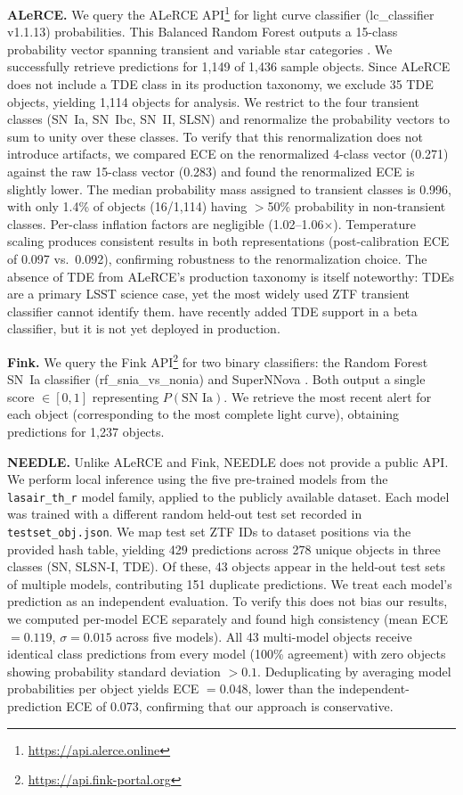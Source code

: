 \documentclass[twocolumn]{aastex631}
\begin{document}
\textbf{ALeRCE.} We query the ALeRCE API\footnote{\url{https://api.alerce.online}} for light curve classifier (lc\_classifier v1.1.13) probabilities. This Balanced Random Forest outputs a 15-class probability vector spanning transient and variable star categories \citep{sanchezsaez2021}. We successfully retrieve predictions for 1,149 of 1,436 sample objects. Since ALeRCE does not include a TDE class in its production taxonomy, we exclude 35 TDE objects, yielding 1,114 objects for analysis. We restrict to the four transient classes (SN~Ia, SN~Ibc, SN~II, SLSN) and renormalize the probability vectors to sum to unity over these classes. To verify that this renormalization does not introduce artifacts, we compared ECE on the renormalized 4-class vector (0.271) against the raw 15-class vector (0.283) and found the renormalized ECE is slightly lower. The median probability mass assigned to transient classes is 0.996, with only 1.4\% of objects (16/1,114) having $>$50\% probability in non-transient classes. Per-class inflation factors are negligible (1.02--1.06$\times$). Temperature scaling produces consistent results in both representations (post-calibration ECE of 0.097 vs.\ 0.092), confirming robustness to the renormalization choice. The absence of TDE from ALeRCE's production taxonomy is itself noteworthy: TDEs are a primary LSST science case, yet the most widely used ZTF transient classifier cannot identify them. \citet{pavezherrera2025} have recently added TDE support in a beta classifier, but it is not yet deployed in production.

\textbf{Fink.} We query the Fink API\footnote{\url{https://api.fink-portal.org}} for two binary classifiers: the Random Forest SN~Ia classifier (rf\_snia\_vs\_nonia) and SuperNNova \citep[snn\_snia\_vs\_nonia;][]{moller2020}. Both output a single score $\in [0,1]$ representing $P(\text{SN~Ia})$. We retrieve the most recent alert for each object (corresponding to the most complete light curve), obtaining predictions for 1,237 objects.

\textbf{NEEDLE.} Unlike ALeRCE and Fink, NEEDLE \citep{sheng2024} does not provide a public API. We perform local inference using the five pre-trained models from the \texttt{lasair\_th\_r} model family, applied to the publicly available dataset. Each model was trained with a different random held-out test set recorded in \texttt{testset\_obj.json}. We map test set ZTF IDs to dataset positions via the provided hash table, yielding 429 predictions across 278 unique objects in three classes (SN, SLSN-I, TDE). Of these, 43 objects appear in the held-out test sets of multiple models, contributing 151 duplicate predictions. We treat each model's prediction as an independent evaluation. To verify this does not bias our results, we computed per-model ECE separately and found high consistency (mean ECE $= 0.119$, $\sigma = 0.015$ across five models). All 43 multi-model objects receive identical class predictions from every model (100\% agreement) with zero objects showing probability standard deviation $> 0.1$. Deduplicating by averaging model probabilities per object yields ECE $= 0.048$, lower than the independent-prediction ECE of 0.073, confirming that our approach is conservative.
\end{document}
